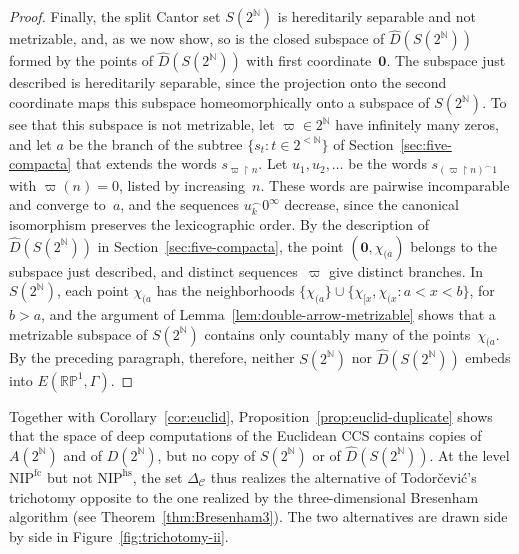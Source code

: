 \documentclass[psamsfonts]{amsart}
\theoremstyle{definition}
\theoremstyle{remark}
\newcommand{\NIP}{\text{NIP}}
\newcommand{\restr}{{\restriction}}
\newcommand{\RP}{\mathbb{R}\mathbb{P}}
\numberwithin{equation}{section}
\begin{document}
\begin{proof}
Finally, the split Cantor set $S(2^{\mathbb{N}})$ is hereditarily separable and not metrizable, and, as we now show, so is the closed subspace of $\hat D(S(2^{\mathbb{N}}))$ formed by the points of $\hat D(S(2^{\mathbb{N}}))$ with first coordinate~$\mathbf{0}$.
The subspace just described is hereditarily separable, since the projection onto the second coordinate maps this subspace homeomorphically onto a subspace of $S(2^{\mathbb{N}})$.
To see that this subspace is not metrizable, let $\varpi\in2^{\mathbb{N}}$ have infinitely many zeros, and let $a$ be the branch of the subtree $\{s_t:t\in2^{<\mathbb{N}}\}$ of Section~\ref{sec:five-compacta} that extends the words $s_{\varpi\restr n}$.
Let $u_1,u_2,\dots$ be the words $s_{(\varpi\restr n)^\frown1}$ with $\varpi(n)=0$, listed by increasing~$n$.
These words are pairwise incomparable and converge to~$a$, and the sequences $u_k^\frown0^\infty$ decrease, since the canonical isomorphism preserves the lexicographic order.
By the description of $\hat D(S(2^{\mathbb{N}}))$ in Section~\ref{sec:five-compacta}, the point $(\mathbf{0},\chi_{(a})$ belongs to the subspace just described, and distinct sequences~$\varpi$ give distinct branches.
In $S(2^{\mathbb{N}})$, each point $\chi_{(a}$ has the neighborhoods $\{\chi_{(a}\}\cup\{\chi_{[x},\chi_{(x}:a<x<b\}$, for $b>a$, and the argument of Lemma~\ref{lem:double-arrow-metrizable} shows that a metrizable subspace of $S(2^{\mathbb{N}})$ contains only countably many of the points~$\chi_{(a}$.
By the preceding paragraph, therefore, neither $S(2^{\mathbb{N}})$ nor $\hat D(S(2^{\mathbb{N}}))$ embeds into $E(\RP^1,\Gamma)$.
\end{proof}

Together with Corollary~\ref{cor:euclid}, Proposition~\ref{prop:euclid-duplicate} shows that the space of deep computations of the Euclidean CCS contains copies of $A(2^{\mathbb{N}})$ and of $D(2^{\mathbb{N}})$, but no copy of $S(2^{\mathbb{N}})$ or of $\hat D(S(2^{\mathbb{N}}))$.
At the level $\NIP^{\mathrm{fc}}$ but not $\NIP^{\mathrm{hs}}$, the set $\Delta_{\mathcal{C}}$ thus realizes the alternative of Todorčević's trichotomy opposite to the one realized by the three-dimensional Bresenham algorithm (see Theorem~\ref{thm:Bresenham3}).
The two alternatives are drawn side by side in Figure~\ref{fig:trichotomy-ii}.
\end{document}
